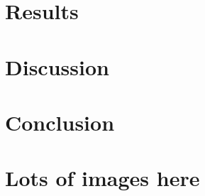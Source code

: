 \documentclass{kththesis}
\begin{document}
\chapter{Results}

\chapter{Discussion}

\chapter{Conclusion}


\printbibliography[heading=bibintoc] %

\appendix

\chapter{Lots of images here}
\end{document}
